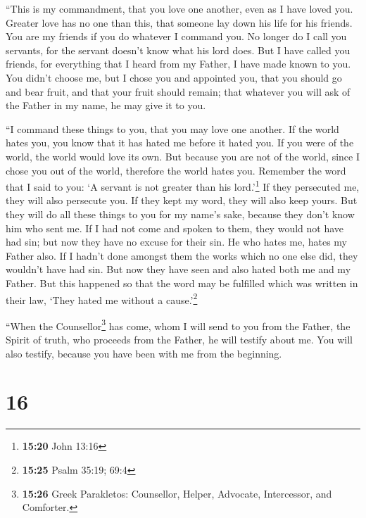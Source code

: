  ``This is my commandment, that you love one another,
even as I have loved you.  Greater love has no one than
this, that someone lay down his life for his friends. 
You are my friends if you do whatever I command you.  No
longer do I call you servants, for the servant doesn't know what his
lord does. But I have called you friends, for everything that I heard
from my Father, I have made known to you.  You didn't
choose me, but I chose you and appointed you, that you should go and
bear fruit, and that your fruit should remain; that whatever you will
ask of the Father in my name, he may give it to you.

 ``I command these things to you, that you may love one
another.  If the world hates you, you know that it has
hated me before it hated you.  If you were of the world,
the world would love its own. But because you are not of the world,
since I chose you out of the world, therefore the world hates you.
 Remember the word that I said to you: `A servant is not
greater than his lord.'\footnote{\textbf{15:20} John 13:16} If they
persecuted me, they will also persecute you. If they kept my word, they
will also keep yours.  But they will do all these things
to you for my name's sake, because they don't know him who sent me.
 If I had not come and spoken to them, they would not
have had sin; but now they have no excuse for their sin. 
He who hates me, hates my Father also.  If I hadn't done
amongst them the works which no one else did, they wouldn't have had
sin. But now they have seen and also hated both me and my Father.
 But this happened so that the word may be fulfilled
which was written in their law, `They hated me without a
cause.'\footnote{\textbf{15:25} Psalm 35:19; 69:4}

 ``When the Counsellor\footnote{\textbf{15:26} Greek
  Parakletos: Counsellor, Helper, Advocate, Intercessor, and Comforter.}
has come, whom I will send to you from the Father, the Spirit of truth,
who proceeds from the Father, he will testify about me. 
You will also testify, because you have been with me from the beginning.

\hypertarget{section-15}{%
\section{16}\label{section-15}}

